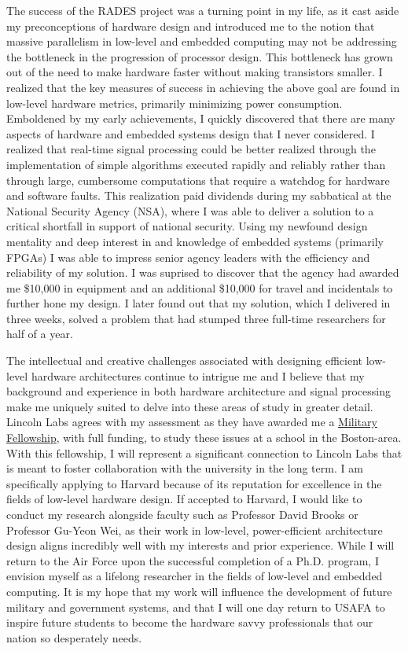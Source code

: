 \documentclass{article}
\begin{document}
The success of the RADES project was a turning point in my life, as it cast
aside my preconceptions of hardware design and introduced me to the notion that
massive parallelism in low-level and embedded computing may not be addressing
the bottleneck in the progression of processor design. This bottleneck has
grown out of the need to make hardware faster without making transistors
smaller. I realized that the key measures of success in achieving the above
goal are found in low-level hardware metrics, primarily minimizing power
consumption. Emboldened by my early achievements, I quickly discovered that
there are many aspects of hardware and embedded systems design that I never
considered. I realized that real-time signal processing could be better
realized through the implementation of simple algorithms executed rapidly and
reliably rather than through large, cumbersome computations that require a
watchdog for hardware and software faults. This realization paid dividends
during my sabbatical at the National Security Agency (NSA), where I was able to
deliver a solution to a critical shortfall in support of national security.
Using my newfound design mentality and deep interest in and knowledge of
embedded systems (primarily FPGAs) I was able to impress senior agency leaders
with the efficiency and reliability of my solution. I was suprised to discover
that the agency had awarded me \$10,000 in equipment and an additional \$10,000
for travel and incidentals to further hone my design. I later found out that my
solution, which I delivered in three weeks, solved a problem that had stumped
three full-time researchers for half of a year. 

The intellectual and creative challenges associated with designing efficient
low-level hardware architectures continue to intrigue me and I believe that my
background and experience in both hardware architecture and signal processing make
me uniquely suited to delve into these areas of study in greater detail.
Lincoln Labs agrees with my assessment as they have awarded me a
\href{http://www.ll.mit.edu/college/fellowsprograms.html}{Military Fellowship},
with full funding, to study these issues at a school in the Boston-area. With
this fellowship, I will represent a significant connection to Lincoln Labs that
is meant to foster collaboration with the university in the long term. I am
specifically applying to Harvard because of its reputation for excellence in
the fields of low-level hardware design. If accepted to Harvard, I would like
to conduct my research alongside faculty such as Professor David Brooks or
Professor Gu-Yeon Wei, as their work in low-level, power-efficient architecture
design aligns incredibly well with my interests and prior experience. While I
will return to the Air Force upon the successful completion of a Ph.D. program,
I envision myself as a lifelong researcher in the fields of low-level and
embedded computing. It is my hope that my work will influence the development
of future military and government systems, and that I will one day return to
USAFA to inspire future students to become the hardware savvy professionals
that our nation so desperately needs.
\end{document}
